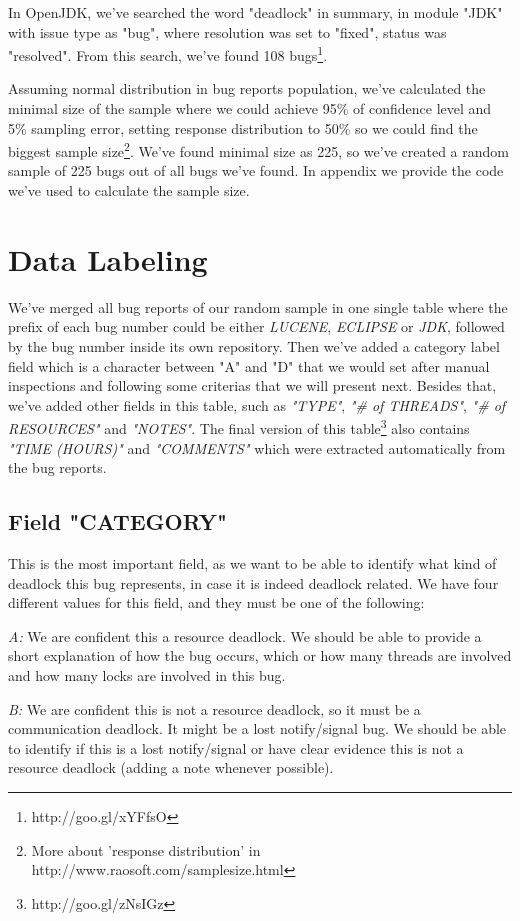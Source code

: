 In OpenJDK, we've searched the word "deadlock" in summary, in module "JDK" with issue type as "bug", where resolution was set to "fixed", status was "resolved". From this search, we've found 108 bugs\footnote{http://goo.gl/xYFfsO}.

Assuming normal distribution in bug reports population, we've calculated the minimal size of the sample where we could achieve 95\% of confidence level and 5\% sampling error, setting response distribution to 50\% so we could find the biggest sample size\footnote{More about 'response distribution' in http://www.raosoft.com/samplesize.html}. We've found minimal size as 225, so we've created a random sample of 225 bugs out of all bugs we've found. In appendix we provide the code we've used to calculate the sample size.

\section{Data Labeling}

We've merged all bug reports of our random sample in one single table where the prefix of each bug number could be either \emph{LUCENE}, \emph{ECLIPSE} or \emph{JDK}, followed by the bug number inside its own repository. Then we've added a category label field which is a character between "A" and "D" that we would set after manual inspections and following some criterias that we will present next. Besides that, we've added other fields in this table, such as \emph{"TYPE"}, \emph{"# of THREADS"}, \emph{"# of RESOURCES"} and \emph{"NOTES"}. The final version of this table\footnote{http://goo.gl/zNsIGz} also contains \emph{"TIME (HOURS)"} and \emph{"COMMENTS"} which were extracted automatically from the bug reports.

\subsection{Field "CATEGORY"}

This is the most important field, as we want to be able to identify what kind of deadlock this bug represents, in case it is indeed deadlock related. We have four different values for this field, and they must be one of the following:

\emph{A:} We are confident this a resource deadlock. We should be able to provide a short explanation of how the bug occurs, which or how many threads are involved and how many locks are involved in this bug.

\emph{B:} We are confident this is not a resource deadlock, so it must be a communication deadlock. It might be a lost notify/signal bug. We should be able to identify if this is a lost notify/signal or have clear evidence this is not a resource deadlock (adding a note whenever possible).

